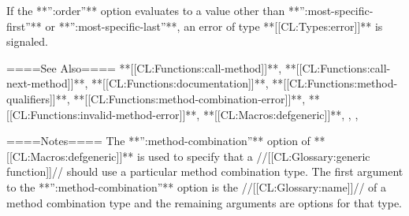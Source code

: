 If the **'':order''** option evaluates to a value other than **'':most-specific-first''** or **'':most-specific-last''**, an error of type **[[CL:Types:error]]** is signaled.

====See Also====
**[[CL:Functions:call-method]]**, **[[CL:Functions:call-next-method]]**, **[[CL:Functions:documentation]]**, **[[CL:Functions:method-qualifiers]]**, **[[CL:Functions:method-combination-error]]**, **[[CL:Functions:invalid-method-error]]**, **[[CL:Macros:defgeneric]]**, {\secref\MethodSelectionAndCombination}, {\secref\BuiltInMethCombTypes}, {\secref\DocVsDecls}

====Notes====
The **'':method-combination''** option of **[[CL:Macros:defgeneric]]** is used to specify that a //[[CL:Glossary:generic function]]// should use a particular method combination type. The first argument to the **'':method-combination''** option is the //[[CL:Glossary:name]]// of a method combination type and the remaining arguments are options for that type.

    
